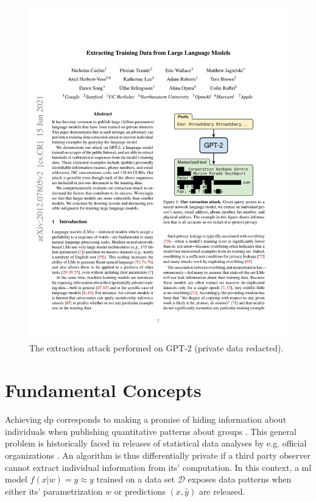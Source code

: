 \documentclass[12pt,fleqn,twocolumn]{article}
\begin{document}
\begin{figure}[H]
    \centering
        \includegraphics[clip, trim=11.5cm 12cm 2.5cm 8cm, width=.8\linewidth]{extracting.pdf}
        \caption{The extraction attack performed on GPT-2 \cite[Fig. 1]{carlini2021extracting} (private data redacted).}
    \label{fig:extracting.pdf}
\end{figure}\noindent

\section*{Fundamental Concepts}%
\label{sec:Fundamental Concepts}
Achieving \acrshort{dp} corresponds to making a promise of hiding information about individuals when publishing quantitative patterns about groups \cite[pp. 5]{dwork2014alg}.
This general problem is historically faced in releases of statistical data analyses by e.g. official organizations \cite{dalenius1977stat, wiki2022diff}.
An algorithm is thus differentially private if a third party observer cannot extract individual information from its' computation.
In this context, a \acrfull{ml} model \(f(x|w)=\hat y \approx y\) trained on a data set \(\mathcal D\) exposes data patterns when either its' parametrization $w$ or predictions $(x, \hat y)$ are released.
\end{document}
